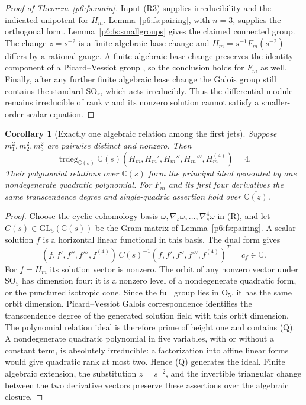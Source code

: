 \documentclass[11pt,a4paper]{article}
\newtheorem{corollary}[theorem]{Corollary}
\theoremstyle{definition}
\theoremstyle{remark}
\numberwithin{equation}{section}
\begin{document}
\begin{proof}[Proof of Theorem~\ref{p6:fs:main}]
Input (R3) supplies irreducibility and the indicated unipotent for
$H_m$. Lemma~\ref{p6:fs:pairing}, with $n=3$, supplies the orthogonal
form. Lemma~\ref{p6:fs:smallgroups} gives the claimed connected group.
The change $z=s^{-2}$ is a finite algebraic base change and
$H_m=s^{-1}F_m(s^{-2})$ differs by a rational gauge. A finite
algebraic base change preserves the identity component of a
Picard--Vessiot group \cite{p5:BG_vdPS2003}, so the conclusion holds
for $F_m$ as well. Finally, after any further finite algebraic
base change the Galois group still contains the standard
$\mathrm{SO}_r$, which acts irreducibly. Thus the differential
module remains irreducible of rank $r$ and its nonzero solution
cannot satisfy a smaller-order scalar equation.
\end{proof}

\begin{corollary}[Exactly one algebraic relation among the first jets]
\label{p6:fs:quadric}
Suppose $m_1^2,m_2^2,m_3^2$ are pairwise distinct and nonzero.
Then
\[
 \operatorname{trdeg}_{\mathbb C(s)}
 \mathbb C(s)(H_m,H_m',H_m'',H_m''',H_m^{(4)})=4.
\]
Their polynomial relations over $\mathbb C(s)$ form the principal
ideal generated by one nondegenerate quadratic polynomial.
For $F_m$ and its first four derivatives the same transcendence
degree and single-quadric assertion hold over
$\overline{\mathbb C(z)}$.
\end{corollary}
\begin{proof}
Choose the cyclic cohomology basis
$\omega,\nabla_s\omega,\ldots,\nabla_s^4\omega$ in (R), and
let $C(s)\in\mathrm{GL}_5(\mathbb C(s))$ be the Gram matrix
of Lemma~\ref{p6:fs:pairing}. A scalar solution $f$ is a horizontal
linear functional in this basis. The dual form gives
\[
 (f,f',f'',f''',f^{(4)})\,C(s)^{-1}
 (f,f',f'',f''',f^{(4)})^{\!T}=c_f\in\mathbb C.
 \tag{Q}
\]
For $f=H_m$ its solution vector is nonzero. The orbit of any
nonzero vector under $\mathrm{SO}_5$ has dimension four: it is a
nonzero level of a nondegenerate quadratic form, or the punctured
isotropic cone. Since the full group lies in $\mathrm O_5$, it has
the same orbit dimension. Picard--Vessiot Galois correspondence
identifies the transcendence degree of the generated solution
field with this orbit dimension. The polynomial relation ideal
is therefore prime of height one and contains (Q). A nondegenerate
quadratic polynomial in five variables, with or without a constant
term, is absolutely irreducible: a factorization into affine linear
forms would give quadratic rank at most two. Hence (Q) generates
the ideal. Finite algebraic extension, the substitution $z=s^{-2}$,
and the invertible triangular change between the two derivative
vectors preserve these assertions over the algebraic closure.
\end{proof}
\end{document}

